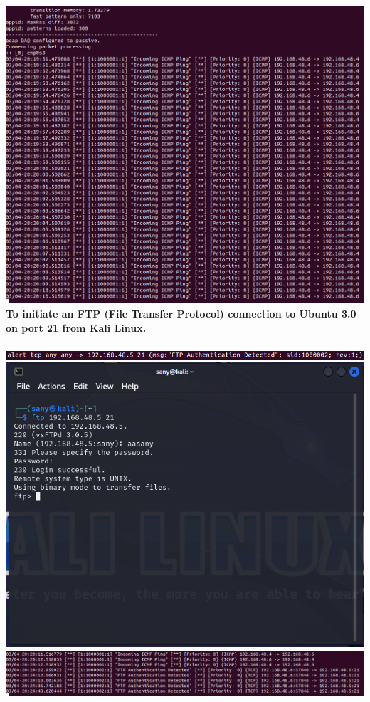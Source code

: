 \documentclass{article}
\begin{document}
\includegraphics[width=1.0\textwidth,height=0.4\textheight]{images/ping3.PNG}
\clearpage
\textbf{To initiate an FTP (File Transfer Protocol) connection to Ubuntu 3.0 on port 21 from Kali Linux.}\\\\
\includegraphics[width=1.0\textwidth]{images/ftp1.PNG}
\includegraphics[width=1.0\textwidth,height=0.4\textheight]{images/ftp2.PNG}
\includegraphics[width=1.0\textwidth]{images/ftp3.PNG}
\end{document}
